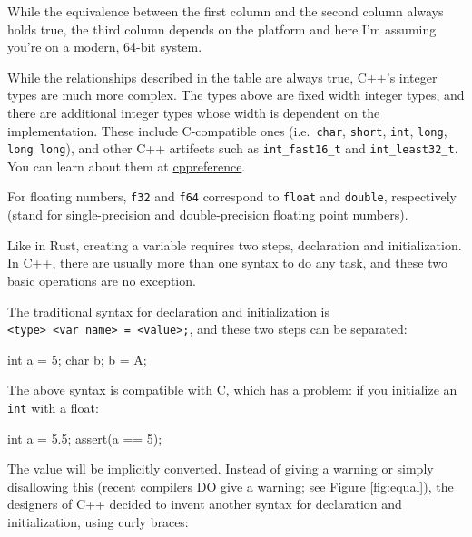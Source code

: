\documentclass[
]{book}
\newenvironment{Shaded}{\begin{snugshade}}{\end{snugshade}}
\newcommand{\CharTok}[1]{\textcolor[rgb]{0.31,0.60,0.02}{#1}}
\newcommand{\DataTypeTok}[1]{\textcolor[rgb]{0.13,0.29,0.53}{#1}}
\newcommand{\DecValTok}[1]{\textcolor[rgb]{0.00,0.00,0.81}{#1}}
\newcommand{\FloatTok}[1]{\textcolor[rgb]{0.00,0.00,0.81}{#1}}
\newcommand{\NormalTok}[1]{#1}
\newcommand{\OtherTok}[1]{\textcolor[rgb]{0.56,0.35,0.01}{#1}}
\begin{document}
While the equivalence between the first column and the second column always holds true, the third column depends on the platform and here I'm assuming you're on a modern, 64-bit system.

While the relationships described in the table are always true, C++'s integer types are much more complex. The types above are fixed width integer types, and there are additional integer types whose width is dependent on the implementation. These include C-compatible ones (i.e.~\texttt{char}, \texttt{short}, \texttt{int}, \texttt{long}, \texttt{long\ long}), and other C++ artifects such as \texttt{int\_fast16\_t} and \texttt{int\_least32\_t}. You can learn about them at \href{https://en.cppreference.com/w/cpp/types/integer}{cppreference}.

For floating numbers, \texttt{f32} and \texttt{f64} correspond to \texttt{float} and \texttt{double}, respectively (stand for single-precision and double-precision floating point numbers).

Like in Rust, creating a variable requires two steps, declaration and initialization. In C++, there are usually more than one syntax to do any task, and these two basic operations are no exception.

The traditional syntax for declaration and initialization is \texttt{\textless{}type\textgreater{}\ \textless{}var\ name\textgreater{}\ =\ \textless{}value\textgreater{};}, and these two steps can be separated:

\begin{Shaded}
\begin{Highlighting}[]
\DataTypeTok{int}\NormalTok{ a = }\DecValTok{5}\NormalTok{;}
\DataTypeTok{char}\NormalTok{ b;}
\NormalTok{b = }\CharTok{\textquotesingle{}A\textquotesingle{}}\NormalTok{;}
\end{Highlighting}
\end{Shaded}

The above syntax is compatible with C, which has a problem: if you initialize an \texttt{int} with a float:

\begin{Shaded}
\begin{Highlighting}[]
\DataTypeTok{int}\NormalTok{ a = }\FloatTok{5.5}\NormalTok{;}
\OtherTok{assert}\NormalTok{(a == }\DecValTok{5}\NormalTok{);}
\end{Highlighting}
\end{Shaded}

The value will be implicitly converted. Instead of giving a warning or simply disallowing this (recent compilers DO give a warning; see Figure \ref{fig:equal}), the designers of C++ decided to invent another syntax for declaration and initialization, using curly braces:
\end{document}
